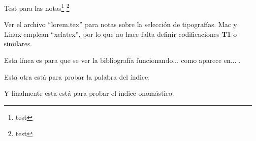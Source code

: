 

Test para las notas\footnote{test} \footnote{test}

Ver el archivo \enquote{lorem.tex} para notas sobre la selección de tipografías. Mac y Linux emplean \enquote{xelatex}, por lo que no hace falta definir codificaciones \textbf{T1} o similares.

Esta línea es para que se ver la bibliografía funcionando... como aparece en... \cite{libro1}.

Esta otra está para probar la palabra del índice. 

Y finalmente esta está para probar el índice onomástico. 

\blindtext[2]